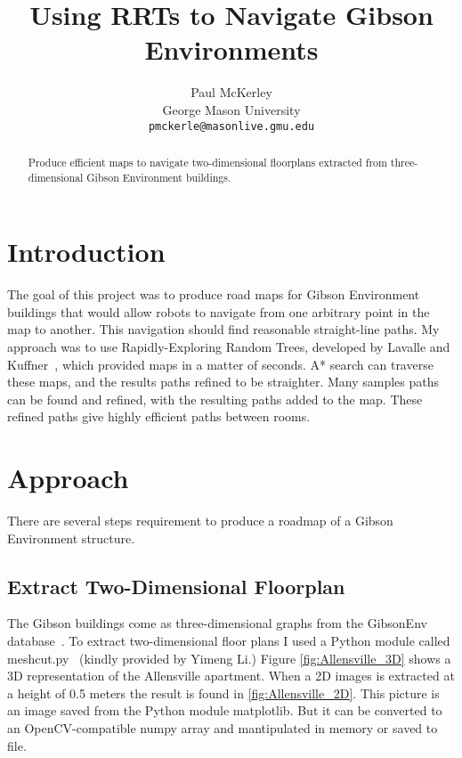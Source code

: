 \documentclass[10pt,twocolumn,letterpaper]{article}
\begin{document}
\title{Using RRTs to Navigate Gibson Environments}

\author{Paul McKerley\\
George Mason University\\
{\tt\small pmckerle@masonlive.gmu.edu}
}

\frenchspacing
\maketitle
\thispagestyle{empty}

\begin{abstract}
  Produce efficient maps to navigate two-dimensional floorplans
  extracted from three-dimensional Gibson Environment buildings.
\end{abstract}

\section{Introduction}

  The goal of this project was to produce road maps for Gibson
  Environment buildings that would allow robots to navigate from one
  arbitrary point in the map to another. This navigation should find
  reasonable straight-line paths. My approach was to use
  Rapidly-Exploring Random Trees, developed by
  Lavalle and Kuffner~\cite{lavalle01}, which provided maps in a matter of
  seconds. A* search can traverse these maps, and the results paths
  refined to be straighter. Many samples paths can be found and
  refined, with the resulting paths added to the map. These refined
  paths give highly efficient paths between rooms.

\section{Approach}

There are several steps requirement to produce a roadmap of a Gibson
Environment structure.

\subsection{Extract Two-Dimensional Floorplan}

The Gibson buildings come as three-dimensional graphs from the
GibsonEnv database~\cite{xiazamirhe2018gibsonenv}. To extract
two-dimensional floor plans I used a Python module called
meshcut.py~\cite{jrebetez00} (kindly provided by Yimeng Li.) Figure
\ref{fig:Allensville_3D} shows a 3D representation of the Allensville
apartment. When a 2D images is extracted at a height of 0.5 meters the
result is found in \ref{fig:Allensville_2D}.  This picture is an image
saved from the Python module matplotlib. But it can be converted to an
OpenCV-compatible numpy array and mantipulated in memory or saved to
file.
\end{document}
